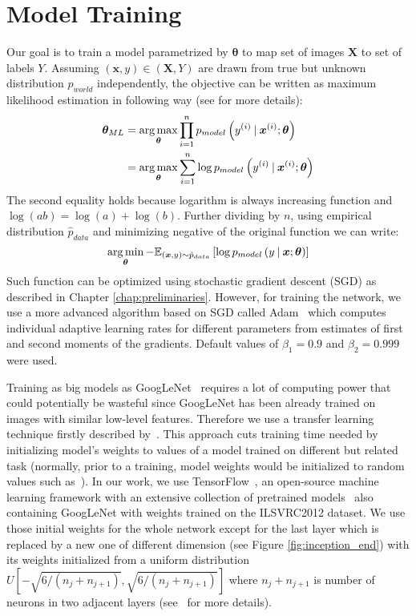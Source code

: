 \section{Model Training}
Our goal is to train a model parametrized by $\bm{\theta}$ to map set of images $\bm{X}$ to set of labels $Y$. Assuming $(\bm{x},y)\in(\bm{X},Y)$ are drawn from true but unknown distribution $p_{world}$ independently, the objective can be written as maximum likelihood estimation in following way (see \cite{Goodfellow-et-al-2016} for more details):
\begin{align}
\bm{\theta}_{ML} &=\mathop{\arg\max}_{\bm{\theta}}\prod\limits_{i=1}^{n} p_{model}\left(y^{(i)}\:\vert\:\bm{x}^{(i)};\bm{\theta}\right) \\
&=\mathop{\arg\max}_{\bm{\theta}}\sum\limits_{i=1}^{n} \log p_{model}\left(y^{(i)}\:\vert\:\bm{x}^{(i)};\bm{\theta}\right)
\end{align}
The second equality holds because logarithm is always increasing function and $\log(ab)=\log(a)+\log(b)$. Further dividing by $n$, using empirical distribution $\hat{p}_{data}$ and minimizing negative of the original function we can write:
\begin{equation}
\mathop{\arg\min}_{\bm{\theta}}-\mathbb{E}_{(\bm{x},y)\sim \hat{p}_{data}}\left[\log p_{model}\left(y\:\vert\:\bm{x};\bm{\theta}\right)\right]\label{eq:mle}
\end{equation}
Such function can be optimized using stochastic gradient descent (SGD) as described in Chapter \ref{chap:preliminaries}. However, for training the network, we use a more advanced algorithm based on SGD called Adam~\cite{adam} which computes individual adaptive learning rates for
different parameters from estimates of first and second moments of the gradients. Default values of $\beta_1 = 0.9$ and $\beta_2 = 0.999$ were used.

Training as big models as GoogLeNet~\cite{szegedy2015going} requires a lot of computing power that could potentially be wasteful since GoogLeNet has been already trained on images with similar low-level features. Therefore we use a transfer learning technique firstly described by~\cite{donahue2014decaf}. This approach cuts training time needed by initializing model's weights to values of a model trained on different but related task (normally, prior to a training, model weights would be initialized to random values such as~\cite{glorot2010understanding}). In our work, we use TensorFlow~\cite{tensorflow2015}, an open-source machine learning framework with an extensive collection of pretrained models~\cite{TFmodels} also containing GoogLeNet with weights trained on the ILSVRC2012 dataset. We use those initial weights for the whole network except for the last layer which is replaced by a new one of different dimension (see Figure \ref{fig:inception_end}) with its weights initialized from a uniform distribution $U\left[-\sqrt{6/(n_j+n_{j+1})}, \sqrt{6/(n_j+n_{j+1})}\right]$ where $n_j+n_{j+1}$ is number of neurons in two adjacent layers (see~\cite{glorot2010understanding} for more details).

